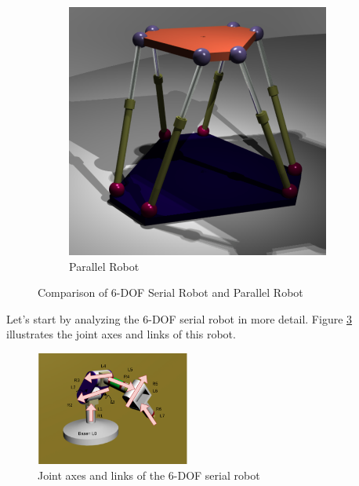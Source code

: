 \begin{figure}[H]
\begin{subfigure}[]{0.35\textwidth}
        \includegraphics[width=\textwidth]{ParallelRobot}
        \caption{Parallel Robot}
        \label{fig:parallelrobot}
    \end{subfigure}
    \caption{Comparison of 6-DOF Serial Robot and Parallel Robot}
    \label{fig:robotcomparison}
\end{figure}




Let's start by analyzing the 6-DOF serial robot in more detail. Figure \ref{fig:6dofserial} illustrates the joint axes and links of this robot.

\begin{figure}[H]
    \centering
    \includegraphics[width=0.45\textwidth]{6dofserial.pdf}
    \caption{Joint axes and links of the 6-DOF serial robot}
    \label{fig:6dofserial}
\end{figure}



